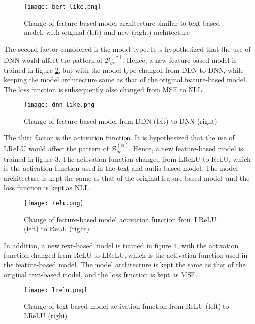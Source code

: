 \begin{figure}[H]
    \centering
    \texttt{[image: bert\_like.png]}
    \caption{Change of feature-based model architecture similar to text-based model, with original (left) and new (right) architecture}
    \label{fig:bert_like}
\end{figure}

The second factor considered is the model type. It is hypothesized that the use of DNN would affect the pattern of $\mathcal{B}^{(ci)}_{gr}$. Hence, a new feature-based model is trained in figure \ref{fig:dnn_like}, but with the model type changed from DDN to DNN, while keeping the model architecture same as that of the original feature-based model. The loss function is subsequently also changed from MSE to NLL.

\begin{figure}[H]
    \centering
    \texttt{[image: dnn\_like.png]}
    \caption{Change of feature-based model from DDN (left) to DNN (right)}
    \label{fig:dnn_like}
\end{figure}

The third factor is the activation function. It is hypothesized that the use of LReLU would affect the pattern of $\mathcal{B}^{(ci)}_{gr}$. Hence, a new feature-based model is trained in figure \ref{fig:relu}. The activation function changed from LReLU to ReLU, which is the activation function used in the text and audio-based model. The model architecture is kept the same as that of the original feature-based model, and the loss function is kept as NLL.

\begin{figure}[H]
    \centering
    \texttt{[image: relu.png]}
    \caption{Change of feature-based model activation function from LReLU (left) to ReLU (right)}
    \label{fig:relu}
\end{figure}

In addition, a new text-based model is trained in figure \ref{fig:lrelu}, with the activation function changed from ReLU to LReLU, which is the activation function used in the feature-based model. The model architecture is kept the same as that of the original text-based model, and the loss function is kept as MSE.

\begin{figure}[H]
    \centering
    \texttt{[image: lrelu.png]}
    \caption{Change of text-based model activation function from ReLU (left) to LReLU (right)}
    \label{fig:lrelu}
\end{figure}

